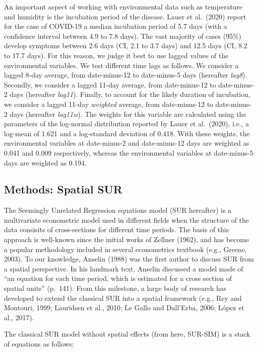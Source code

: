 \documentclass[]{elsarticle} %
\begin{document}
An important aspect of working with environmental data such as
temperature and humidity is the incubation period of the disease. Lauer
et al.~(2020) report for the case of COVID-19 a median incubation period
of 5.7 days (with a confidence interval between 4.9 to 7.8 days). The
vast majority of cases (95\%) develop symptoms between 2.6 days (CI, 2.1
to 3.7 days) and 12.5 days (CI, 8.2 to 17.7 days). For this reason, we
judge it best to use lagged values of the environmental variables. We
test different time lags as follows. We consider a lagged 8-day average,
from date-minus-12 to date-minus-5 days (hereafter \emph{lag8}).
Secondly, we consider a lagged 11-day average, from date-minus-12 to
date-minus-2 days (hereafter \emph{lag11}). Finally, to account for the
likely duration of incubation, we consider a lagged 11-day
\emph{weighted} average, from date-minus-12 to date-minus-2 days
(hereafter \emph{lag11w}). The weights for this variable are calculated
using the parameters of the log-normal distribution reported by Lauer et
al.~(2020), i.e., a log-mean of 1.621 and a log-standard deviation of
0.418. With these weights, the environmental variables at date-minus-2
and date-minus-12 days are weighted as 0.041 and 0.009 respectively,
whereas the environmental variables at date-minus-5 days are weighted as
0.194.

\hypertarget{methods-spatial-sur}{%
\subsection{Methods: Spatial SUR}\label{methods-spatial-sur}}

The Seemingly Unrelated Regression equations model (SUR hereafter) is a
multivariate econometric model used in different fields when the
structure of the data consisits of cross-sections for different time
periods. The basis of this approach is well-known since the initial
works of Zellner (1962), and has become a popular methodology included
in several econometrics textbook (e.g., Greene, 2003). To our knowledge,
Anselin (1988) was the first author to discuss SUR from a spatial
perspective. In his landmark text, Anselin discussed a model made of
``an equation for each time period, which is estimated for a cross
section of spatial units'' (p.~141). From this milestone, a large body
of research has developed to extend the classical SUR into a spatial
framework (e.g., Rey and Montouri, 1999; Lauridsen et al., 2010; Le
Gallo and Dall'Erba, 2006; López et al., 2017).

The classical SUR model without spatial effects (from here, SUR-SIM) is
a stack of equations as follows:
\end{document}
